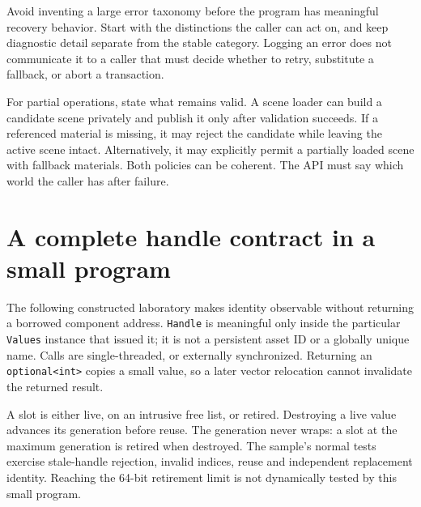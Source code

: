 Avoid inventing a large error taxonomy before the program has meaningful recovery behavior. Start with the distinctions the caller can act on, and keep diagnostic detail separate from the stable category. Logging an error does not communicate it to a caller that must decide whether to retry, substitute a fallback, or abort a transaction.

For partial operations, state what remains valid. A scene loader can build a candidate scene privately and publish it only after validation succeeds. If a referenced material is missing, it may reject the candidate while leaving the active scene intact. Alternatively, it may explicitly permit a partially loaded scene with fallback materials. Both policies can be coherent. The API must say which world the caller has after failure.

\section{A complete handle contract in a small program}\label{05-engine-i-ch008-a-complete-handle-contract-in-a-small-program}

\hypertarget{05-engine-i-ch008-a-complete-handle-contract-in-a-small-program}{}

The following constructed laboratory makes identity observable without returning a borrowed component address. \texttt{Handle} is meaningful only inside the particular \texttt{Values} instance that issued it; it is not a persistent asset ID or a globally unique name. Calls are single-threaded, or externally synchronized. Returning an \texttt{optional\textless{}int\textgreater{}} copies a small value, so a later vector relocation cannot invalidate the returned result.

A slot is either live, on an intrusive free list, or retired. Destroying a live value advances its generation before reuse. The generation never wraps: a slot at the maximum generation is retired when destroyed. The sample's normal tests exercise stale-handle rejection, invalid indices, reuse and independent replacement identity. Reaching the 64-bit retirement limit is not dynamically tested by this small program.

